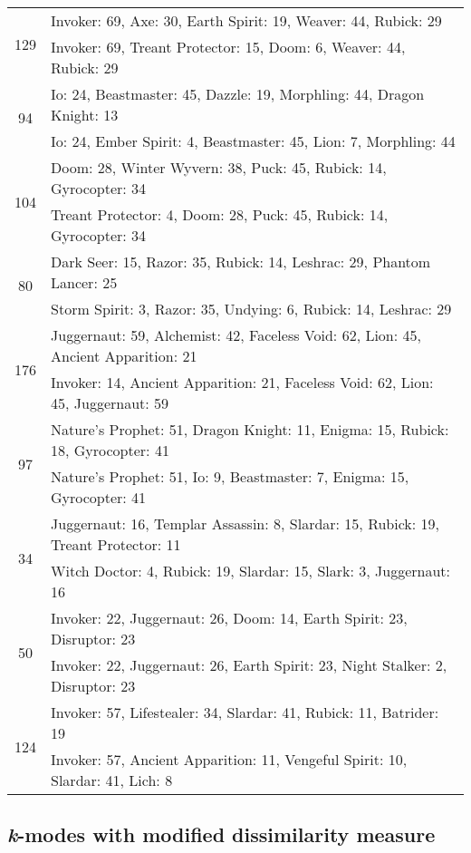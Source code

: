 \documentclass[result.tex]{subfiles}
\begin{document}
\begin{table}[H]
\begin{tabular}{ | c | p{12.5cm} | }
\hline
\multirow{2}{*}{129}
& Invoker: 69, Axe: 30, Earth Spirit: 19, Weaver: 44, Rubick: 29 \\
& Invoker: 69, Treant Protector: 15, Doom: 6, Weaver: 44, Rubick: 29 \\
\hline
\multirow{2}{*}{94}
& Io: 24, Beastmaster: 45, Dazzle: 19, Morphling: 44, Dragon Knight: 13 \\
& Io: 24, Ember Spirit: 4, Beastmaster: 45, Lion: 7, Morphling: 44 \\
\hline
\multirow{2}{*}{104}
& Doom: 28, Winter Wyvern: 38, Puck: 45, Rubick: 14, Gyrocopter: 34 \\
& Treant Protector: 4, Doom: 28, Puck: 45, Rubick: 14, Gyrocopter: 34 \\
\hline
\multirow{2}{*}{80}
& Dark Seer: 15, Razor: 35, Rubick: 14, Leshrac: 29, Phantom Lancer: 25 \\
& Storm Spirit: 3, Razor: 35, Undying: 6, Rubick: 14, Leshrac: 29 \\
\hline
\multirow{2}{*}{176}
& Juggernaut: 59, Alchemist: 42, Faceless Void: 62, Lion: 45, Ancient Apparition: 21 \\
& Invoker: 14, Ancient Apparition: 21, Faceless Void: 62, Lion: 45, Juggernaut: 59 \\
\hline
\multirow{2}{*}{97}
& Nature's Prophet: 51, Dragon Knight: 11, Enigma: 15, Rubick: 18, Gyrocopter: 41 \\
& Nature's Prophet: 51, Io: 9, Beastmaster: 7, Enigma: 15, Gyrocopter: 41 \\
\hline
\multirow{2}{*}{34}
& Juggernaut: 16, Templar Assassin: 8, Slardar: 15, Rubick: 19, Treant Protector: 11 \\
& Witch Doctor: 4, Rubick: 19, Slardar: 15, Slark: 3, Juggernaut: 16 \\
\hline
\multirow{2}{*}{50}
& Invoker: 22, Juggernaut: 26, Doom: 14, Earth Spirit: 23, Disruptor: 23 \\
& Invoker: 22, Juggernaut: 26, Earth Spirit: 23, Night Stalker: 2, Disruptor: 23 \\
\hline
\multirow{2}{*}{124}
& Invoker: 57, Lifestealer: 34, Slardar: 41, Rubick: 11, Batrider: 19 \\
& Invoker: 57, Ancient Apparition: 11, Vengeful Spirit: 10, Slardar: 41, Lich: 8 \\
\hline
    \end{tabular}
    \caption{}
    \label{}
    \end{table}

\subsection*{\textit{k}-modes with modified dissimilarity measure}
\end{document}
